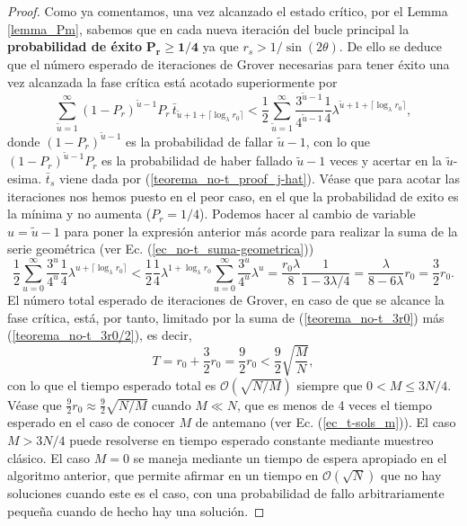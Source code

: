 \documentclass[a4paper,11pt]{article} %
\numberwithin{equation}{section}
\begin{document}
\begin{proof}
Como ya comentamos, una vez alcanzado el estado crítico, por el Lemma \ref{lemma_Pm}, sabemos que en cada nueva iteración del bucle principal la \textbf{probabilidad de éxito} $\bm{P_r \geq 1/4}$ ya que $r_s > 1/\sin (2 \theta)$. De ello se deduce que el número esperado de iteraciones de Grover necesarias para tener éxito una vez alcanzada la fase crítica está acotado superiormente por
\begin{equation}
\sum_{\tilde{u}=1}^\infty (1-P_r)^{\tilde{u}-1} P_r \, \bar{t}_{\tilde{u}+1+\lceil \log_\lambda r_0 \rceil} < \frac{1}{2} \sum_{\tilde{u}=1}^\infty \frac{3^{\tilde{u}-1}}{4^{\tilde{u}-1}} \frac{1}{4} \lambda^{\tilde{u}+1+\lceil \log_\lambda r_0 \rceil},
\end{equation}
donde $(1-P_r)^{\tilde{u}-1}$ es la probabilidad de fallar $\tilde{u}-1$, con lo que $(1-P_r)^{\tilde{u}-1} P_r$ es la probabilidad de haber fallado $\tilde{u}-1$ veces y acertar en la $\tilde{u}$-esima. $\bar{t}_s$ viene dada por (\ref{teorema_no-t_proof_j-hat}). Véase que para acotar las iteraciones nos hemos puesto en el peor caso, en el que la probabilidad de exito es la mínima y no aumenta ($P_r = 1/4$). Podemos hacer al cambio de variable $u = \tilde{u} -1$ para poner la expresión anterior más acorde para realizar la suma de la serie geométrica (ver Ec. (\ref{ec_no-t_suma-geometrica}))
\begin{equation} \label{teorema_no-t_3r0/2}
\frac{1}{2} \sum_{u=0}^\infty \frac{3^{u}}{4^{u}} \frac{1}{4} \lambda^{u+\lceil \log_\lambda r_0 \rceil} 
< 
\frac{1}{2}  \frac{1}{4} \lambda^{1+ \log_\lambda r_0}  \sum_{u=0}^\infty \frac{3^{u}}{4^{u}} \lambda^{u} 
= 
\frac{r_0 \lambda}{8} \frac{1}{1-3 \lambda/4} 
= \frac{\lambda}{8-6 \lambda}r_0 = \boxed{ \frac{3}{2} r_0}.
\end{equation}
El número total esperado de iteraciones de Grover, en caso de que se alcance la fase crítica, está, por tanto, limitado por la suma de (\ref{teorema_no-t_3r0}) más (\ref{teorema_no-t_3r0/2}), es decir, 
\begin{equation}
T = r_0 + \frac{3}{2} r_0 = \frac{9}{2} r_0 < \frac{9}{2} \sqrt{\frac{M}{N}},
\end{equation}  
con lo que el tiempo esperado total es $\mathcal{O}(\sqrt{N/M})$ siempre que $0 < M \leq 3N/4$. Véase que $\frac{9}{2} r_0 \approx \frac{9}{2} \sqrt{N/M}$ cuando $M \ll N$, que es menos de 4 veces el tiempo esperado en el caso de conocer $M$ de antemano (ver Ec. (\ref{ec_t-sols_m})). El caso $M > 3N/4$ puede resolverse en tiempo esperado constante mediante muestreo clásico. El caso $M = 0$ se maneja mediante un tiempo de espera apropiado en el algoritmo anterior, que permite afirmar en un tiempo en $\mathcal{O} (\sqrt{N})$ que no hay soluciones cuando este es el caso, con una probabilidad de fallo arbitrariamente pequeña cuando de hecho hay una solución.
\end{proof}
\end{document}
